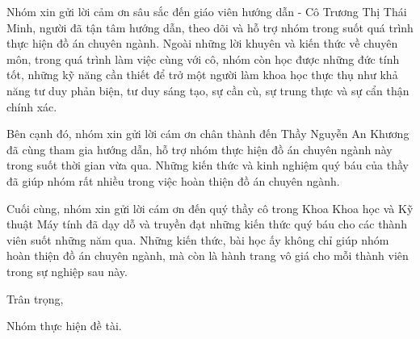 \documentclass[a4paper, twoside, 12pt]{report}
\theoremstyle{definition}
\begin{document}
Nhóm xin gửi lời cảm ơn sâu sắc đến giáo viên hướng dẫn - Cô Trương Thị Thái Minh, người đã tận tâm hướng dẫn, theo dõi và hỗ trợ nhóm trong suốt quá trình thực hiện đồ án chuyên ngành. Ngoài những lời khuyên và kiến thức về chuyên môn, trong quá trình làm việc cùng với cô, nhóm còn học được những đức tính tốt, những kỹ năng cần thiết để trở một người làm khoa học thực thụ như khả năng tư duy phản biện, tư duy sáng tạo, sự cần cù, sự trung thực và sự cẩn thận chính xác.

Bên cạnh đó, nhóm xin gửi lời cám ơn chân thành đến Thầy Nguyễn An Khương đã cùng tham gia hướng dẫn, hỗ trợ nhóm thực hiện đồ án chuyên ngành này trong suốt thời gian vừa qua. Những kiến thức và kinh nghiệm quý báu của thầy đã giúp nhóm rất nhiều trong việc hoàn thiện đồ án chuyên ngành.

Cuối cùng, nhóm xin gửi lời cám ơn đến quý thầy cô trong Khoa Khoa học và Kỹ thuật Máy tính đã dạy dỗ và truyền đạt những kiến thức quý báu cho các thành viên suốt những năm qua. Những kiến thức, bài học ấy không chỉ giúp nhóm hoàn thiện đồ án chuyên ngành, mà còn là hành trang vô giá cho mỗi thành viên trong sự nghiệp sau này.

\hspace{10cm} Trân trọng,

\hspace{9cm} Nhóm thực hiện đề tài.

\setlength{\parskip}{0mm}

\tableofcontents

\newpage
\listoffigures
\newpage

\listoftables



% 


% 


% 
\end{document}
